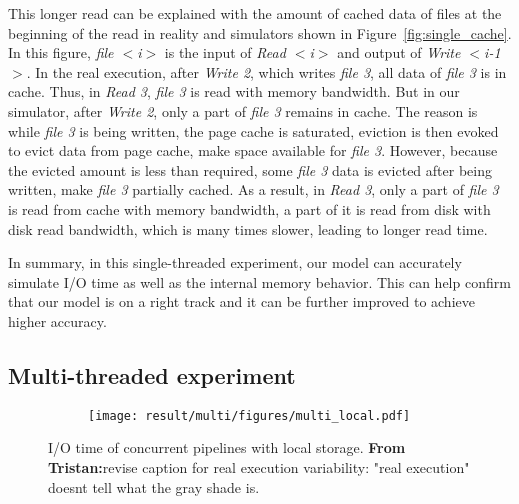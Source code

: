 \documentclass[conference]{IEEEtran}
\newcommand{\tristan}[1]{\color{orange}\textbf{From Tristan:}#1\color{black}}
\begin{document}
            This longer read can be explained with the amount of cached data of files 
            at the beginning of the read in reality and simulators shown in 
            Figure~\ref{fig:single_cache}.             
            In this figure, \textit{file $<$i$>$} is the input of \textit{Read $<$i$>$} and 
            output of \textit{Write $<$i-1$>$}. 
            In the real execution, after \textit{Write 2}, which writes \textit{file 3}, 
            all data of \textit{file 3} is in cache. 
            Thus, in \textit{Read 3}, \textit{file 3} is read with memory bandwidth. 
            But in our simulator, after \textit{Write 2}, only a part of \textit{file 3} 
            remains in cache. 
            The reason is while \textit{file 3}  is being written, the page cache is saturated, 
            eviction is then evoked to evict data from page cache, make space 
            available for \textit{file 3}. 
            However, because the evicted amount is less than required, 
            some \textit{file 3} data is evicted after being written, make \textit{file 3} 
            partially cached. 
            As a result, in \textit{Read 3}, only a part of \textit{file 3} is read from cache 
            with memory bandwidth, a part of it is read from disk with disk read bandwidth, 
            which is many times slower, leading to longer read time.             
            
            In summary, in this single-threaded experiment, our model can accurately 
            simulate I/O time as well as the internal memory behavior. 
            This can help confirm that our model is on a right track and 
            it can be further improved to achieve higher accuracy.
            
        \subsection{Multi-threaded experiment}
        
            \begin{figure*}        
            \begin{subfigure}{\linewidth}
                \centering
                   \texttt{[image: result/multi/figures/multi\_local.pdf]}
            \end{subfigure}        
            \caption{I/O time of concurrent pipelines with local storage. \tristan{revise caption for real execution variability: "real execution" doesnt tell what the gray shade is.}}
            \label{fig:multi_local}
            \end{figure*}        
            
\end{document}
